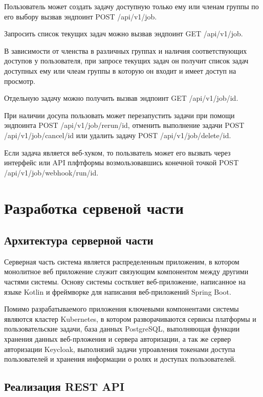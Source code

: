 Пользователь может создать задачу доступную только ему или членам группы по его выбору вызвав эндпоинт POST /api/v1/job.

Запросить список текущих задач можно вызвав эндпоинт GET /api/v1/job.

В зависимости от членства в различных группах и наличия соответствующих доступов у пользователя, при запросе текущих задач он получит список задач доступных ему или члеам группы в которую он входит и имеет доступ на просмотр.

Отдельную задачу можно получить вызвав эндпоинт GET /api/v1/job/{id}.

При наличии досупа пользовать может перезапустить задачи при помощи эндпоинта POST /api/v1/job/rerun/{id}, отменить выполнение задачи POST /api/v1/job/cancel/{id} или удалить задачу POST /api/v1/job/delete/{id}.

Если задача является веб-хуком, то пользватель может его вызвать через интерфейс или API плфтформы возмользовавшись конечной точкой POST /api/v1/job/webhook/run/{id}.

\section{Разработка сервеной части}

\subsection{Архитектура серверной части}

Серверная часть система является распределенным приложеним, в котором монолитное веб приложение служит связующим компонентом между другими частями системы.
Основу системы соствляет веб-приложение, написанное на языке Kotlin и фреймворке для написания веб-приложений Spring Boot.

Помимо разрабатываемого приложения ключевыми компонентами системы являются кластер Kubernetes, в котором разворачиваются сервисы платформы и пользовательские задачи, база данных PostgreSQL, выполняющая функции хранения данных веб-прложения и сервера авторизации, а так же сервер авторизации Keycloak, выполнязий задачи упроавления токенами доступа пользователей и хранения информации о ролях и доступах пользователей.

\subsection{Реализация REST API}


